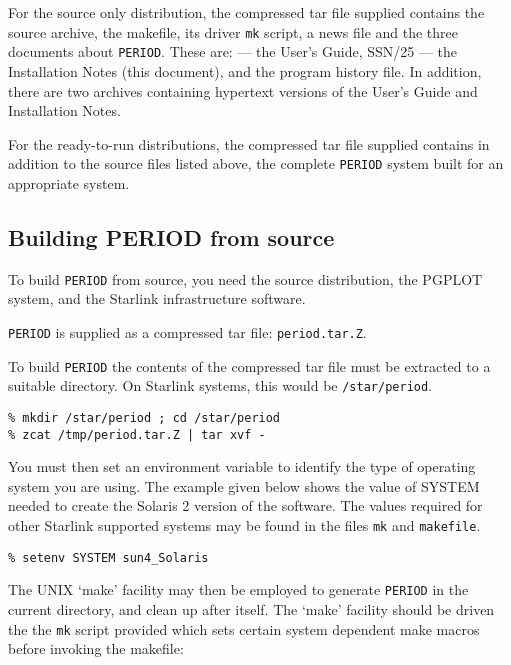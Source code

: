 For the source only distribution, the compressed tar file supplied
contains the source archive, the makefile, its driver {\tt mk} script,
a news file and the three documents about {\tt PERIOD}.  These are:
 --- the User's Guide, SSN/25 --- the
Installation Notes (this document), and the program history file.  In
addition, there are two
archives containing hypertext versions of the User's Guide and
Installation Notes.

For the ready-to-run distributions, the compressed tar file supplied
contains in addition to the source files listed above, the complete
{\tt PERIOD} system built for an appropriate system.

\subsection{Building PERIOD from source}

To build {\tt PERIOD} from source, you need the source distribution, the
PGPLOT system, and the Starlink infrastructure software.

{\tt PERIOD} is supplied as a compressed tar file: {\tt period.tar.Z}.

To build {\tt PERIOD} the contents of the compressed tar file must be
extracted to a suitable directory.  On Starlink systems, this
would be {\tt /star/period}.

\begin{myquote}
\begin{verbatim}
% mkdir /star/period ; cd /star/period
% zcat /tmp/period.tar.Z | tar xvf -
\end{verbatim}
\end{myquote}
 
You must then set an environment variable to identify the type of
operating system you are using.  The example given below shows the
value of SYSTEM needed to create the Solaris 2 version of the software.
The values required for other Starlink supported systems may be found
in the files {\tt mk} and {\tt makefile}.

\begin{myquote} 
\begin{verbatim} 
% setenv SYSTEM sun4_Solaris
\end{verbatim} 
\end{myquote}

The UNIX `make' facility may then be employed to generate {\tt PERIOD}
in the current directory, and clean up after itself.  The `make' facility
should be driven the the {\tt mk} script provided which sets certain 
system dependent make macros before invoking the makefile:

